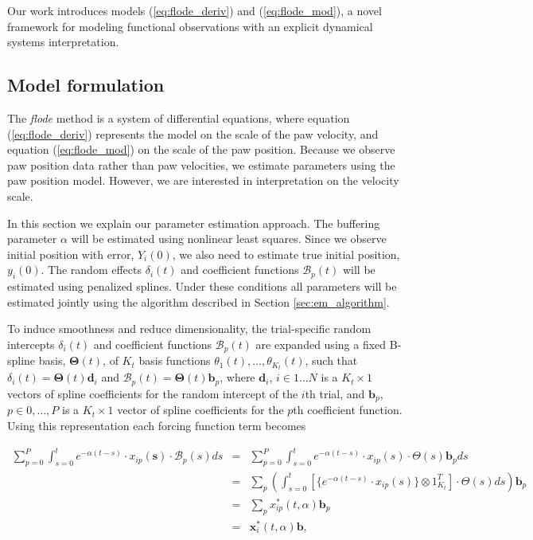 \documentclass[preprint]{JASA}
\begin{document}
\label{sec:methods}

Our work introduces models (\ref{eq:flode_deriv}) and
(\ref{eq:flode_mod}), a novel framework for modeling functional
observations with an explicit dynamical systems interpretation.

\hypertarget{model-formulation}{%
\subsection{Model formulation}\label{model-formulation}}

The \emph{flode} method is a system of differential equations, where
equation (\ref{eq:flode_deriv}) represents the model on the scale of the
paw velocity, and equation (\ref{eq:flode_mod}) on the scale of the paw
position. Because we observe paw position data rather than paw
velocities, we estimate parameters using the paw position model.
However, we are interested in interpretation on the velocity scale.

In this section we explain our parameter estimation approach. The
buffering parameter \(\alpha\) will be estimated using nonlinear least
squares. Since we observe initial position with error, \(Y_i(0)\), we
also need to estimate true initial position, \(y_i(0)\). The random
effects \(\delta_i(t)\) and coefficient functions \(\mathcal{B}_p(t)\)
will be estimated using penalized splines. Under these conditions all
parameters will be estimated jointly using the algorithm described in
Section \ref{sec:em_algorithm}.

To induce smoothness and reduce dimensionality, the trial-specific
random intercepts \(\delta_i(t)\) and coefficient functions
\(\mathcal{B}_p(t)\) are expanded using a fixed B-spline basis,
\(\mathbf{\Theta}(t)\), of \(K_t\) basis functions
\(\theta_1(t),\ldots , \theta_{K_t}(t)\), such that
\(\delta_i(t) = \mathbf{\Theta}(t)\mathbf{d}_i\) and
\(\mathcal{B}_p(t) = \mathbf{\Theta}(t)\mathbf{b}_p\), where
\(\mathbf{d}_i\), \(i \in 1\ldots N\) is a \(K_t \times 1\) vectors of
spline coefficients for the random intercept of the \(i\)th trial, and
\(\mathbf{b}_p\), \(p \in 0, \ldots, P\) is a \(K_t \times 1\) vector of
spline coefficients for the \(p\)th coefficient function. Using this
representation each forcing function term becomes

\begin{eqnarray*}
\sum_{p=0}^P \int_{s=0}^t e^{-\alpha (t-s)} \cdot x_{ip}(\mathbf{s}) \cdot \mathcal{B}_p(s) ds &=&\sum_{p=0}^P \int_{s=0}^t e^{-\alpha (t-s)} \cdot x_{ip}(s) \cdot  \Theta(s)\mathbf{b}_p ds \\[5mm]
&=& \sum_p \left(\int_{s=0}^t \left[\{e^{-\alpha (t-s)}\cdot x_{ip}(s)\}\otimes 1^T_{K_t}\right] \cdot \Theta(s) ds\right)\mathbf{b}_p \\[5mm]
&=& \sum_px_{ip}^*(t, \alpha)\mathbf{b}_p\\
&=& \mathbf{x}_i^*(t, \alpha)\mathbf{b},
\end{eqnarray*}
\end{document}
